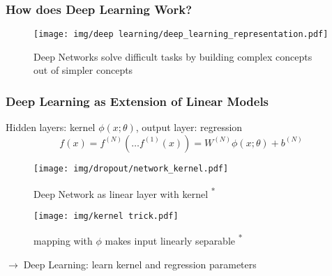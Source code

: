\documentclass{beamer}
\newcommand{\arrow}{$\rightarrow\;$}
\renewcommand{\k}[2]{#1^{(#2)}}
\begin{document}
\begin{frame}
    \frametitle{How does Deep Learning Work?}
    \begin{figure}
        \begin{minipage}[c]{0.67\textwidth}
          \texttt{[image: img/deep learning/deep\_learning\_representation.pdf]}
        \end{minipage}\hfill
        \begin{minipage}[c]{0.3\textwidth}
          \caption{
            Deep Networks solve difficult tasks by building complex concepts out of simpler concepts \cite{textbook}
          } \label{fig:03-03}
        \end{minipage}
      \end{figure}
\end{frame}

\begin{frame}
    \frametitle{Deep Learning as Extension of Linear Models}
    Hidden layers: kernel $\phi(x; \theta)$, output layer: regression
    \begin{equation*}
        f(x) = \k{f}{N}(\ldots \k{f}{1}(x)) = \k{W}{N}\phi(x; \theta) + \k{b}{N}
    \end{equation*}
    
    \begin{minipage}[b]{0.49\textwidth}
        \begin{figure}
            \texttt{[image: img/dropout/network\_kernel.pdf]}
            \caption{Deep Network as linear layer with kernel \cite{dropout}\textsuperscript{*}}
        \end{figure}
    \end{minipage}
    \begin{minipage}[b]{0.49\textwidth}
        \begin{figure}
            \texttt{[image: img/kernel trick.pdf]}
            \caption{mapping with $\phi$ makes input linearly separable \cite{kernel}\textsuperscript{*}}
        \end{figure}
    \end{minipage}
    
    \arrow Deep Learning: learn kernel and regression parameters
\end{frame}
\end{document}
